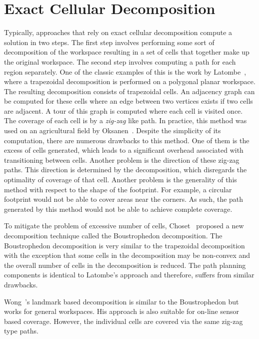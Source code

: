 \documentclass[../main.tex]{subfiles}
\begin{document}
\section{Exact Cellular Decomposition}
\label{section:exact_cellular_decomposition}

Typically, approaches that rely on exact cellular decomposition compute a solution in two steps. The first step involves performing some sort of decomposition of the workspace resulting in a set of cells that together make up the original workspace. The second step involves computing a path for each region separately. One of the classic examples of this is the work by Latombe~\cite{latombe1991exact}, where a trapezoidal decomposition is performed on a polygonal planar workspace. The resulting decomposition consists of trapezoidal cells. An adjacency graph can be computed for these cells where an edge between two vertices exists if two cells are adjacent. A tour of this graph is computed where each cell is visited once. The coverage of each cell is by a \emph{zig-zag} like path.  In practice, this method was used on an agricultural field by Oksanen~\cite{Oksanen2009coverage}. Despite the simplicity of its computation, there are numerous drawbacks to this method. One of them is the excess of cells generated, which leads to a significant overhead associated with transitioning between cells. Another problem is the direction of these zig-zag paths. This direction is determined by the decomposition, which disregards the optimality of coverage of that cell. Another problem is the generality of this method with respect to the shape of the footprint. For example, a circular footprint would not be able to cover areas near the corners. As such, the path generated by this method would not be able to achieve complete coverage.

To mitigate the problem of excessive number of cells, Choset~\cite{choset2000coverage} proposed a new decomposition technique called the Boustrophedon decomposition. The Boustrophedon decomposition is very similar to the trapezoidal decomposition with the exception that some cells in the decomposition may be non-convex and the overall number of cells in the decomposition is reduced. The path planning components is identical to Latombe's approach and therefore, suffers from similar drawbacks.

Wong~\cite{wong2004complete}'s landmark based decomposition is similar to the Boustrophedon but works for general workspaces. His approach is also suitable for on-line sensor based coverage. However, the individual cells are covered via the same zig-zag type paths.
\end{document}
